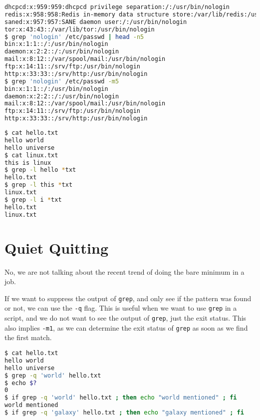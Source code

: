 \begin{lstlisting}[language=bash]
dhcpcd:x:959:959:dhcpcd privilege separation:/:/usr/bin/nologin
redis:x:958:958:Redis in-memory data structure store:/var/lib/redis:/usr/bin/nologin
saned:x:957:957:SANE daemon user:/:/usr/bin/nologin
tor:x:43:43::/var/lib/tor:/usr/bin/nologin
$ grep 'nologin' /etc/passwd | head -n5
bin:x:1:1::/:/usr/bin/nologin
daemon:x:2:2::/:/usr/bin/nologin
mail:x:8:12::/var/spool/mail:/usr/bin/nologin
ftp:x:14:11::/srv/ftp:/usr/bin/nologin
http:x:33:33::/srv/http:/usr/bin/nologin
$ grep 'nologin' /etc/passwd -m5
bin:x:1:1::/:/usr/bin/nologin
daemon:x:2:2::/:/usr/bin/nologin
mail:x:8:12::/var/spool/mail:/usr/bin/nologin
ftp:x:14:11::/srv/ftp:/usr/bin/nologin
http:x:33:33::/srv/http:/usr/bin/nologin
\end{lstlisting}

\begin{lstlisting}[language=bash]
$ cat hello.txt
hello world
hello universe
$ cat linux.txt
this is linux
$ grep -l hello *txt
hello.txt
$ grep -l this *txt
linux.txt
$ grep -l i *txt
hello.txt
linux.txt
\end{lstlisting}

\section{Quiet Quitting}

No, we are not talking about the recent trend of doing the bare minimum in a job.

If we want to suppress the output of \lstinline|grep|, and only see if the pattern was found or not, we can use the \lstinline|-q| flag. This is useful when we want to use \lstinline|grep| in a script, and we do not want to see the output of \lstinline|grep|, just the exit status.
This also implies \lstinline|-m1|, as we can determine the exit status of \lstinline|grep| as soon as we find the first match.

\begin{lstlisting}[language=bash]
$ cat hello.txt
hello world
hello universe
$ grep -q 'world' hello.txt
$ echo $?
0
$ if grep -q 'world' hello.txt ; then echo "world mentioned" ; fi
world mentioned
$ if grep -q 'galaxy' hello.txt ; then echo "galaxy mentioned" ; fi
\end{lstlisting}

